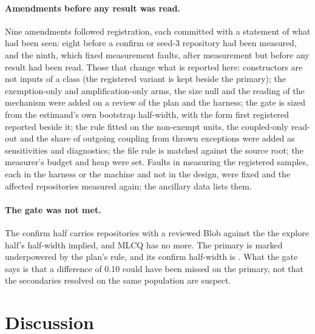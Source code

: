 \documentclass[11pt,a4paper]{article}
\begin{document}
\paragraph{Amendments before any result was read.} Nine amendments
followed registration, each committed with a statement of what had been
seen: eight before a confirm or seed-3 repository had been measured, and
the ninth, which fixed measurement faults, after measurement but before
any result had been read. Those that change what is reported here: constructors are not inputs of a class
(the registered variant is kept beside the primary); the exemption-only and
amplification-only arms, the size null and the reading of the mechanism
were added on a review of the plan and the harness; the gate is sized from
the estimand's own bootstrap half-width, with the form first registered
reported beside it; the rule fitted on the non-exempt units, the
coupled-only read-out and the share of outgoing coupling from thrown
exceptions were added as sensitivities and diagnostics; the file rule is
matched against the source root; the measurer's budget and heap were set.
Faults in measuring the registered samples, each in the harness or the
machine and not in the design, were fixed and the affected repositories
measured again; the ancillary data lists them.

\paragraph{The gate was not met.} The confirm half carries
\primGateReposWithBlob{} repositories with a reviewed Blob against the
\gateRequired{} the explore half's half-width implied, and MLCQ has no more.
The primary is marked underpowered by the plan's rule, and its confirm
half-width is \primHalfWidthConfirm{}. What the gate says is that a
difference of 0.10 could have been missed on the primary, not that the
secondaries resolved on the same population are suspect.

\section{Discussion}
\label{sec:disc}
\end{document}

